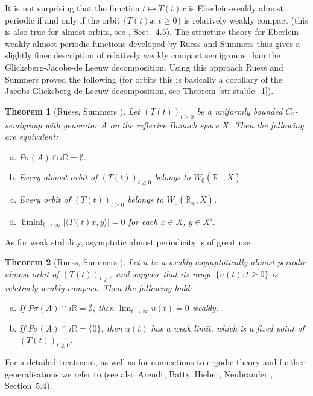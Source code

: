 \documentclass[11pt,intlimits, draft,oneside]{amsart}
\newtheorem{thm}{Theorem}[section]
\theoremstyle{definition}
\def\Psigma{P\sigma}
\def\RR{\mathbb{R}}
\begin{document}
It is not surprising that the function $t\mapsto T(t)x$ is
Eberlein-weakly almost periodic if and only if the orbit
$\{T(t)x:t\geq 0\}$ is relatively weakly compact (this is also true
for almost orbits, see \cite{ruess/summers:1990pac}, Sect.~4.5). The
structure theory for Eberlein-weakly almost periodic functions
developed by Ruess and Summers thus gives a slightly finer
description of relatively weakly compact semigroups than the
Glicksberg-Jacobs-de Leeuw decomposition. Using this approach Ruess
and Summers proved the following (for orbits this is basically a
corollary of the Jacobs-Glicksberg-de Leeuw decomposition, see
Theorem \ref{str.stable_1}).
\begin{thm}[{Ruess, Summers \cite{ruess/summers:1990pac}}] Let
$(T(t))_{t\geq 0}$ be a uniformly bounded $C_0$-semigroup with
generator $A$ on the reflexive Banach space $X$. Then the following are
equivalent:
\begin{enumerate}[a)]
\item $\Psigma(A)\cap i\RR=\emptyset$.
\item Every almost orbit of $(T(t))_{t\geq 0}$ belongs to
$W_0(\RR_+,X)$.
\item Every  orbit of $(T(t))_{t\geq 0}$ belongs to
$W_0(\RR_+,X)$.
\item $\liminf_{t\to\infty} |\langle
T(t)x,y\rangle|=0$ for each $x\in X$, $y\in X'$.
\end{enumerate}
\end{thm}


As for weak stability, asymptotic almost periodicity is of great use.
\begin{thm}[{Ruess, Summers \cite{ruess/summers:1992jmaa}}]
 Let $u$ be a weakly asymptotically almost periodic almost orbit of $(T(t))_{t\geq 0}$ and suppose that its range $\{u(t):t\geq 0\}$ is relatively weakly compact.
  Then the following
 hold:
\begin{enumerate}[a)]
\item If $\Psigma(A)\cap i\RR=\emptyset$, then $\lim_{t\to\infty}
u(t)= 0$ weakly.
\item If $\Psigma(A)\cap i\RR=\{0\}$, then $u(t)$ has a weak limit,
  which is
a fixed point of $(T(t))_{t\geq 0}$.
\end{enumerate}
\end{thm}

For a detailed treatment, as well as for connections to ergodic
theory and further generalisations we refer to
\cite{ruess/summers:1986,ruess/summers:1988,ruess/summers:1990a,ruess/summers:1990pac,ruess/summers:1992pam, ruess/summers:1992jmaa}
(see also Arendt, Batty, Hieber, Neubrander \cite{arendt/etal:2001},
Section~5.4).
\end{document}

